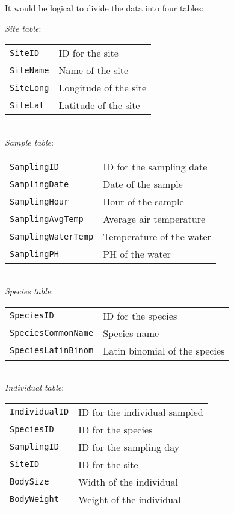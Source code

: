 It would be logical to divide the data into four tables:

{\it Site table}:\\
	\begin{tabular}{p{3cm} p{6cm}}
		{\tt SiteID} & ID for the site\\
		{\tt SiteName} & Name of the site\\
		{\tt SiteLong} & Longitude of the site\\
		{\tt SiteLat} & Latitude of the site\\
	\end{tabular}\\

{\it Sample table}:\\
	\begin{tabular}{p{4cm} p{6cm}}
		{\tt SamplingID} & ID for the sampling date\\
		{\tt SamplingDate} & Date of the sample\\
		{\tt SamplingHour} & Hour of the sample\\
		{\tt SamplingAvgTemp} & Average air temperature\\
		{\tt SamplingWaterTemp} & Temperature of the water\\
		{\tt SamplingPH} & PH of the water\\
	\end{tabular}\\
    
{\it Species table}:\\
	\begin{tabular}{p{4cm} p{6cm}}
     {\tt SpeciesID} & ID for the species\\
     {\tt SpeciesCommonName} & Species name\\
     {\tt SpeciesLatinBinom} & Latin binomial of the species\\
    \end{tabular}\\

  {\it Individual table}:\\
 	 \begin{tabular}{p{3cm} p{6cm}}
      {\tt IndividualID} & ID for the individual sampled\\
      {\tt SpeciesID} & ID for the species\\
      {\tt SamplingID} & ID for the sampling day\\
      {\tt SiteID} & ID for the site\\
      {\tt BodySize} & Width of the individual\\
      {\tt BodyWeight} & Weight of the individual\\
    \end{tabular}\\
 
